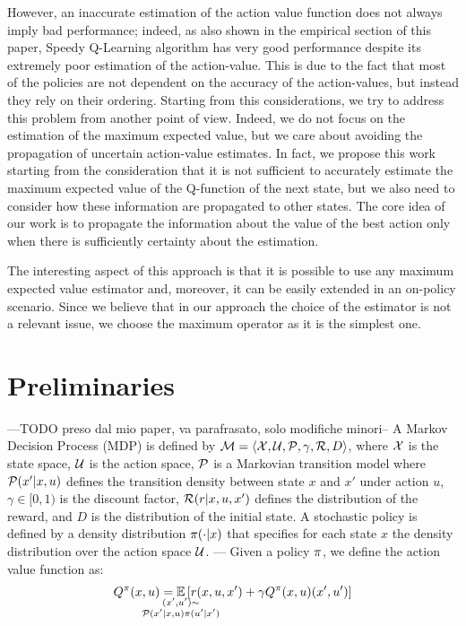 \documentclass[conference]{IEEEtran}
\begin{document}
However, an inaccurate estimation of the action value function does not always imply bad performance; indeed, as also shown in the empirical section of this paper, Speedy Q-Learning algorithm \cite{NIPS2011_4251} has very good performance despite its extremely poor estimation of the action-value. This is due to the fact that most of the policies are not dependent on the accuracy of the action-values, but instead they rely on their ordering. Starting from this considerations, we try to address this problem from another point of view. Indeed, we do not focus on the estimation of the maximum expected value, but we care about avoiding the propagation of uncertain action-value estimates. 
In fact, we propose this work starting from the consideration that it is not sufficient to accurately estimate the maximum expected value of the Q-function of the next state, but we also need to consider how these information are propagated to other states. The core idea of our work is to propagate the information about the value of the best action only when there is sufficiently certainty about the estimation.

The interesting aspect of this approach is that it is possible to use any maximum expected value estimator and, moreover, it can be easily extended in an on-policy scenario. Since we believe that in our approach the choice of the estimator is not a relevant issue, we choose the maximum operator as it is the simplest one.

\section{Preliminaries}
---TODO preso dal mio paper, va parafrasato, solo modifiche minori--
A Markov Decision Process (MDP) is defined by $\mathcal{M} = \langle \mathcal X,\mathcal U,\mathcal{P},\gamma,\mathcal{R}, D\rangle$, where $\mathcal X$ is the state space, $\mathcal U$ is the action space, $\mathcal{P}$ is a Markovian transition model where $\mathcal{P}(x'|x,u)$ defines the transition density between state $x$ and $x'$ under action $u$, $\gamma\in[0,1)$ is the discount factor, $\mathcal{R}(r|x, u, x')$ defines the distribution of the reward, and $D$ is the distribution of the initial state.
A stochastic policy is defined by a density distribution $\pi(\cdot|x)$ that specifies for each state $x$ the density distribution over the action space $\mathcal U$.
---
Given a policy $\pi$, we define the action value function as:
\begin{align}
 Q^\pol(x,u)=\underset{\strut\mathclap{\substack{(x', u')\sim \\ \Pmodel(x'|x,u)\pol(u'|x')}}}{\mathbb{E}}\left[ r(x,u,x')+\gamma Q^\pol(x,u)(x',u')\right]
 \label{eq:qpol}
\end{align}
\end{document}
